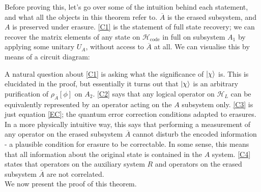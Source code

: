 \documentclass[12pt,a4paper]{report}
\numberwithin{equation}{section}
\newcommand{\Hcode}{\mathcal{H}_{\text{code}}}
\newcommand{\ol}[1]{\overline{#1}}
\theoremstyle{definition}
\theoremstyle{theorem}
\theoremstyle{theorem}
\theoremstyle{example}
\theoremstyle{definition}
\begin{document}
Before proving this, let's go over some of the intuition behind each statement, and what all the objects in this theorem refer to. $\ol{A}$ is the erased subsystem, and $A$ is preserved under erasure. \ref{C1} is the statement of full state recovery; we can recover the matrix elements of any state on $\Hcode$ in full on subsystem $A_{1}$ by applying some unitary $U_{A}$, without access to $\ol{A}$ at all. We can visualise this by means of a circuit diagram:
\begin{figure}[H] 
	\centering
\end{figure}
A natural question about \ref{C1} is asking what the significance of $\ket{\chi}$ is. This is elucidated in the proof, but essentially it turns out that $\ket{\chi}$ is an arbitrary purification of $\rho_{\ol{A}}[\phi]$ on $A_{2}$. \ref{C2} says that any logical operator on $\mathcal{H}_{L}$ can be equivalently represented by an operator acting on the $A$ subsystem only. \ref{C3} is just equation \ref{EC}; the quantum error correction conditions adapted to erasures. In a more physically intuitive way, this says that performing a measurement of any operator on the erased subsystem $\ol{A}$ cannot disturb the encoded information - a plausible condition for erasure to be correctable. In some sense, this means that all information about the original state is contained in the $A$ system. \ref{C4} states that operators on the auxiliary system $R$ and operators on the erased subsystem $\ol{A}$ are not correlated.\\
We now present the proof of this theorem.
\newcommand{\Xabar}{X_{\overline{A}}}
\end{document}
